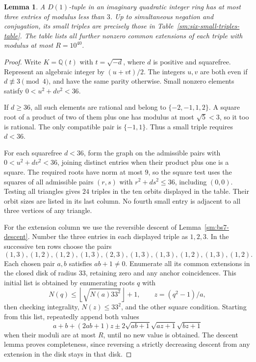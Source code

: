 \documentclass[12pt]{article}
\newtheorem{lemma}[theorem]{Lemma}
\numberwithin{equation}{section}
\begin{document}
\begin{lemma}\label{sm:six-small-triple-classification}
A $D(1)$-tuple in an imaginary quadratic integer ring has at most three entries of modulus less than $3$. Up to simultaneous negation and conjugation, its small triples are precisely those in Table~\ref{sm:six-small-triples-table}. The table lists all further nonzero common extensions of each triple with modulus at most $R=10^{40}$.
\end{lemma}
\begin{proof}
Write $K=\mathbb Q(t)$ with $t=\sqrt{-d}$, where $d$ is positive and squarefree. Represent an algebraic integer by $(u+vt)/2$. The integers $u,v$ are both even if $d\not\equiv3\pmod4$, and have the same parity otherwise. Small nonzero elements satisfy $0<u^2+dv^2<36$.

If $d\ge36$, all such elements are rational and belong to $\{-2,-1,1,2\}$. A square root of a product of two of them plus one has modulus at most $\sqrt5<3$, so it too is rational. The only compatible pair is $\{-1,1\}$. Thus a small triple requires $d<36$.

For each squarefree $d<36$, form the graph on the admissible pairs with $0<u^2+dv^2<36$, joining distinct entries when their product plus one is a square. The required roots have norm at most $9$, so the square test uses the squares of all admissible pairs $(r,s)$ with $r^2+ds^2\le36$, including $(0,0)$. Testing all triangles gives $24$ triples in the ten orbits displayed in the table. Their orbit sizes are listed in its last column. No fourth small entry is adjacent to all three vertices of any triangle.

For the extension column we use the reversible descent of Lemma~\ref{sm:bs7-descent}. Number the three entries in each displayed triple as $1,2,3$. In the successive ten rows choose the pairs
\[
 (1,3),(1,2),(1,2),(1,3),(2,3),
 (1,3),(1,3),(1,2),(1,3),(1,2).
\]
Each chosen pair $a,b$ satisfies $ab+1\ne0$. Enumerate all its common extensions in the closed disk of radius $33$, retaining zero and any anchor coincidences. This initial list is obtained by enumerating roots $q$ with
\[
 N(q)\le\left\lfloor\sqrt{N(a)33^2}\right\rfloor+1,
 \qquad z=(q^2-1)/a,
\]
then checking integrality, $N(z)\le33^2$, and the other square condition. Starting from this list, repeatedly append both values
\[
 a+b+(2ab+1)z\pm2\sqrt{ab+1}\sqrt{az+1}\sqrt{bz+1}
\]
when their moduli are at most $R$, until no new value is obtained. The descent lemma proves completeness, since reversing a strictly decreasing descent from any extension in the disk stays in that disk.


\end{proof}
\end{document}
